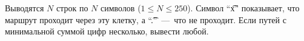 Выводятся $N$ строк по $N$ символов ($1 \le N \le 250$). Символ ``\t{x}'' показывает, что маршрут проходит через эту клетку, а ``\t{.}''~---~что не проходит. Если путей с минимальной суммой цифр несколько, вывести любой.